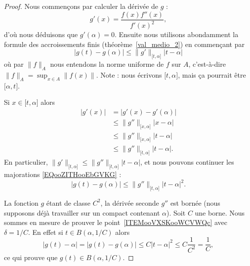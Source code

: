 \begin{proof}
	Nous commençons par calculer la dérivée de \( g\) :
	\begin{equation}
		g'(x)=\frac{ f(x)f''(x) }{ f'(x)^2 },
	\end{equation}
	d'où nous déduisons que \( g'(\alpha)=0\). Ensuite nous utilisons abondamment la formule des accroissements finis (théorème~\ref{val_medio_2}) en commençant par
	\begin{equation}        \label{EQooZITHooEbGVKG}
		| g(t)-g(\alpha) |\leq \| g' \|_{\mathopen[ t , \alpha \mathclose]}| t-\alpha |
	\end{equation}
	où par \( \| f \|_A\) nous entendons la norme uniforme de \( f\) sur \( A\), c'est-à-dire \( \| f \|_A=\sup_{x\in A}\| f(x) \|\). Note : nous écrivons \( \mathopen[ t , \alpha \mathclose]\), mais ça pourrait être \( \mathopen[ \alpha , t \mathclose]\).

	Si \( x\in\mathopen[ t , \alpha \mathclose]\) alors
	\begin{subequations}
		\begin{align}
			| g'(x) | & =| g'(x)-g'(\alpha) |                                           \\
			          & \leq \| g'' \|_{\mathopen[ x , \alpha \mathclose]}| x-\alpha |  \\
			          & \leq \| g'' \|_{\mathopen[ x , \alpha \mathclose]}| t-\alpha |  \\
			          & \leq \| g'' \|_{\mathopen[ t , \alpha \mathclose]}| t-\alpha |.
		\end{align}
	\end{subequations}
	En particulier, \( \| g' \|_{\mathopen[ t , \alpha \mathclose]}\leq \| g'' \|_{\mathopen[ t , \alpha \mathclose]}| t-\alpha |\), et nous pouvons continuer les majorations \eqref{EQooZITHooEbGVKG} :
	\begin{equation}
		| g(t)-g(\alpha) |\leq \| g'' \|_{\mathopen[ t , \alpha \mathclose]}| t-\alpha |^2.
	\end{equation}

	La fonction \( g\) étant de classe \( C^2\), la dérivée seconde \( g''\) est bornée (nous supposons déjà travailler sur un compact contenant \( \alpha\)). Soit \( C\) une borne. Nous sommes en mesure de prouver le point~\ref{ITEMooVXSKooWCVWQc} avec \( \delta=1/C\). En effet si \( t\in B(\alpha,1/C)\) alors
	\begin{equation}
		| g(t)-\alpha |=| g(t)-g(\alpha) |\leq C| t-\alpha |^2\leq C\frac{1}{ C^2 }=\frac{1}{ C },
	\end{equation}
	ce qui prouve que \( g(t)\in B(\alpha,1/C)\).


\end{proof}
